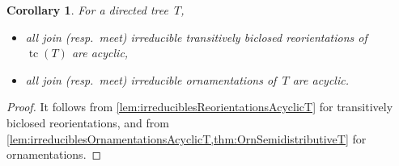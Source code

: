 \documentclass{amsart}
\newtheorem{corollary}[theorem]{Corollary}
\theoremstyle{definition}
\DeclareMathOperator{\tc}{tc} %
\begin{document}
\begin{corollary}
\label{coro:irreduciblesAcyclicT}
For a directed tree~$T$, 
\begin{itemize}
\item all join (resp.~meet) irreducible transitively biclosed reorientations of~$\tc(T)$ are acyclic,
\item all join (resp.~meet) irreducible ornamentations of~$T$ are acyclic.
\end{itemize}
\end{corollary}

\begin{proof}
It follows from \cref{lem:irreduciblesReorientationsAcyclicT} for transitively biclosed reorientations, and from \cref{lem:irreduciblesOrnamentationsAcyclicT,thm:OrnSemidistributiveT} for ornamentations.
\end{proof}
\end{document}
